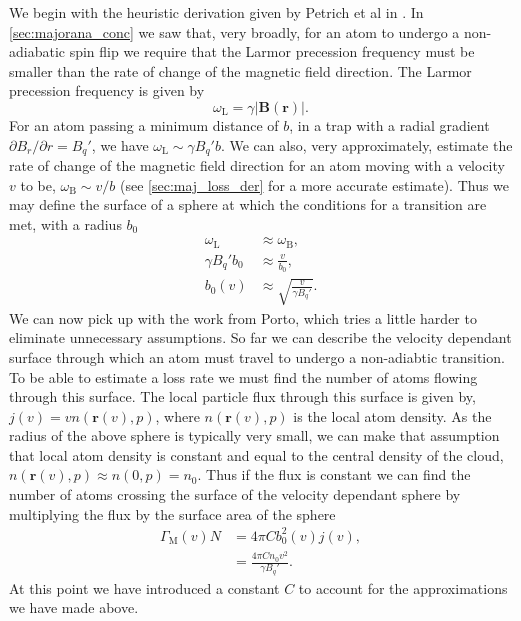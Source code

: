 We begin with the heuristic derivation given by Petrich et al in \cite{Petrich1995}.
In \autoref{sec:majorana_conc} we saw that, very broadly, for an atom to undergo a non-adiabatic spin flip we require that the Larmor precession frequency must be smaller than the rate of change of the magnetic field direction.
The Larmor precession frequency is given by
\begin{equation}
    \omega_{\textrm{L}} = \gamma \vert \mathbf{B}(\mathbf{r}) \vert.
\end{equation}
For an atom passing a minimum distance of $b$, in a trap with a radial gradient $\partial B_r / \partial r = B_q'$, we have $\omega_{\textrm{L}} \sim \gamma B_q' b$. 
We can also, very approximately, estimate the rate of change of the magnetic field direction for an atom moving with a velocity $v$ to be, $\omega_{\mathrm{B}} \sim v / b$ (see \autoref{sec:maj_loss_der} for a more accurate estimate).
Thus we may define the surface of a sphere at which the conditions for a transition are met, with a radius $b_0$
\begin{align}
    \omega_{\textrm{L}} &\approx \omega_{\textrm{B}},\\
    \gamma B_q' b_0 &\approx \frac{v}{b_0},\\
    b_0(v) &\approx \sqrt{\frac{v}{\gamma B_q'}}. \label{eq:majorana_radius}
\end{align}
We can now pick up with the work from Porto, which tries a little harder to eliminate unnecessary assumptions.
So far we can describe the velocity dependant surface through which an atom must travel to undergo a non-adiabtic transition.
To be able to estimate a loss rate we must find the number of atoms flowing through this surface.
The local particle flux through this surface is given by, $j(v) = v n( \mathbf{r}(v),p)$, where $n(\mathbf{r}(v),p)$ is the local atom density. 
As the radius of the above sphere is typically very small, we can make that assumption that local atom density is constant and equal to the central density of the cloud, $n(\mathbf{r}(v),p) \approx n(0,p) = n_0$.
Thus if the flux is constant we can find the number of atoms crossing the surface of the velocity dependant sphere by multiplying the flux by the surface area of the sphere
\begin{align}
    \Gamma_{\textrm{M}}(v)N &= 4\pi C b_0^2(v)j(v),\\ 
    &= \frac{ 4\pi C n_0 v^2 } { \gamma B_q'}.
\end{align}
At this point we have introduced a constant $C$ to account for the approximations we have made above.
